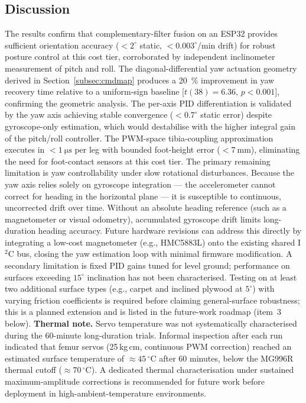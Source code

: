 \documentclass[journal]{IEEEtran}
\newcommand{\dg}{^{\circ}}
\begin{document}
\subsection{Discussion}
The results confirm that complementary-filter fusion on an ESP32
provides sufficient orientation accuracy ($<2\dg$ static,
$<0.003\dg$/min drift) for robust posture control at this cost
tier, corroborated by independent inclinometer measurement of
pitch and roll.
The diagonal-differential yaw actuation geometry derived in
Section~\ref{subsec:cmdmap} produces a \SI{20}{\percent}
improvement in yaw recovery time relative to a uniform-sign
baseline [$t(38)=6.36$, $p<0.001$], confirming the geometric
analysis.
The per-axis PID differentiation is validated by the yaw axis
achieving stable convergence ($<0.7\dg$ static error) despite
gyroscope-only estimation, which would destabilise with the
higher integral gain of the pitch/roll controller.
The PWM-space tibia-coupling approximation executes in
$<\SI{1}{\micro\second}$ per leg with bounded foot-height error
($<\SI{7}{\milli\metre}$), eliminating the need for
foot-contact sensors at this cost tier.
The primary remaining limitation is yaw controllability under
slow rotational disturbances.
Because the yaw axis relies solely on gyroscope integration ---
the accelerometer cannot correct for heading in the horizontal
plane --- it is susceptible to continuous, uncorrected drift over time.
Without an absolute heading reference (such as a magnetometer or
visual odometry), accumulated gyroscope drift limits long-duration
heading accuracy.
Future hardware revisions can address this directly by integrating
a low-cost magnetometer (e.g., HMC5883L) onto the existing shared
I$^2$C bus, closing the yaw estimation loop with minimal firmware
modification.
A secondary limitation is fixed PID gains tuned for level ground;
performance on surfaces exceeding $15\dg$ inclination has not
been characterised.
Testing on at least two additional surface types (e.g., carpet
and inclined plywood at $5\dg$) with varying friction
coefficients is required before claiming general-surface
robustness; this is a planned extension and is listed in the
future-work roadmap (item~3 below).
\noindent\textbf{Thermal note.}
Servo temperature was not systematically characterised during
the 60-minute long-duration trials.
Informal inspection after each run indicated that femur servos
(25\,kg\,cm, continuous PWM correction) reached an estimated
surface temperature of $\approx45\,\dg\text{C}$ after
60 minutes, below the MG996R thermal cutoff ($\approx70\,\dg\text{C}$).
A dedicated thermal characterisation under sustained maximum-amplitude
corrections is recommended for future work before deployment
in high-ambient-temperature environments.
\end{document}

